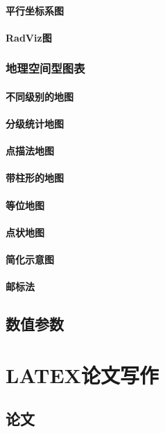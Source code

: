 \documentclass[openany]{progbookcn}
\begin{document}
\subsection{平行坐标系图}
\subsection{RadViz图}

\section{地理空间型图表}
\subsection{不同级别的地图}
\subsection{分级统计地图}
\subsection{点描法地图}
\subsection{带柱形的地图}
\subsection{等位地图}
\subsection{点状地图}
\subsection{简化示意图}
\subsection{邮标法}

\chapter{数值参数}
\part{LATEX论文写作}
\chapter{论文}
\end{document}
